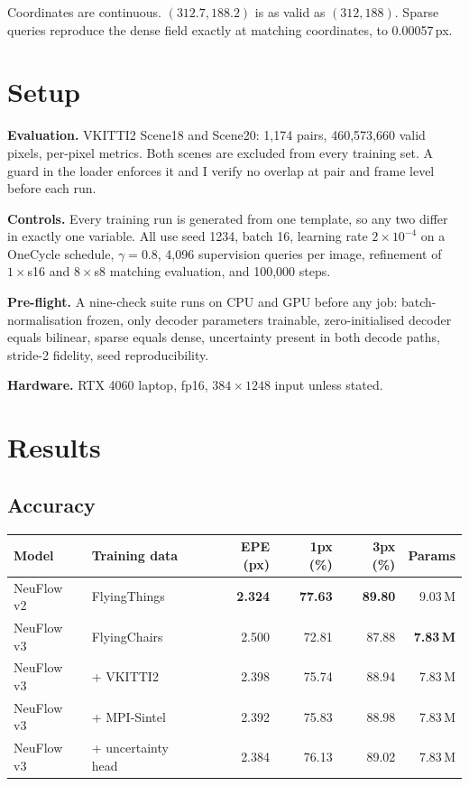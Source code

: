 \documentclass[11pt,a4paper]{article}
\newcommand{\px}{\,px}
\begin{document}
Coordinates are continuous. $(312.7, 188.2)$ is as valid as $(312, 188)$. Sparse
queries reproduce the dense field exactly at matching coordinates, to
0.00057\px.

\section{Setup}
\textbf{Evaluation.} VKITTI2 Scene18 and Scene20: 1{,}174 pairs, 460{,}573{,}660
valid pixels, per-pixel metrics. Both scenes are excluded from every training set.
A guard in the loader enforces it and I verify no overlap at pair and frame level
before each run.

\textbf{Controls.} Every training run is generated from one template, so any two
differ in exactly one variable. All use seed 1234, batch 16, learning rate
$2\times10^{-4}$ on a OneCycle schedule, $\gamma = 0.8$, 4{,}096 supervision
queries per image, refinement of $1\times$s16 and $8\times$s8 matching evaluation,
and 100{,}000 steps.

\textbf{Pre-flight.} A nine-check suite runs on CPU and GPU before any job:
batch-normalisation frozen, only decoder parameters trainable, zero-initialised
decoder equals bilinear, sparse equals dense, uncertainty present in both decode
paths, stride-2 fidelity, seed reproducibility.

\textbf{Hardware.} RTX 4060 laptop, fp16, $384\times1248$ input unless stated.

\section{Results}
\label{sec:results}

\subsection{Accuracy}\label{sec:accuracy}
\begin{center}
\small
\begin{tabular}{llrrrr}
\toprule
Model & Training data & EPE (px) & 1px (\%) & 3px (\%) & Params \\
\midrule
NeuFlow v2 & FlyingThings & \textbf{2.324} & \textbf{77.63} & \textbf{89.80} & 9.03\,M \\
NeuFlow v3 & FlyingChairs & 2.500 & 72.81 & 87.88 & \textbf{7.83\,M} \\
NeuFlow v3 & \quad + VKITTI2 & 2.398 & 75.74 & 88.94 & 7.83\,M \\
NeuFlow v3 & \quad + MPI-Sintel & 2.392 & 75.83 & 88.98 & 7.83\,M \\
NeuFlow v3 & \quad + uncertainty head & 2.384 & 76.13 & 89.02 & 7.83\,M \\
\bottomrule
\end{tabular}
\end{center}
\end{document}
